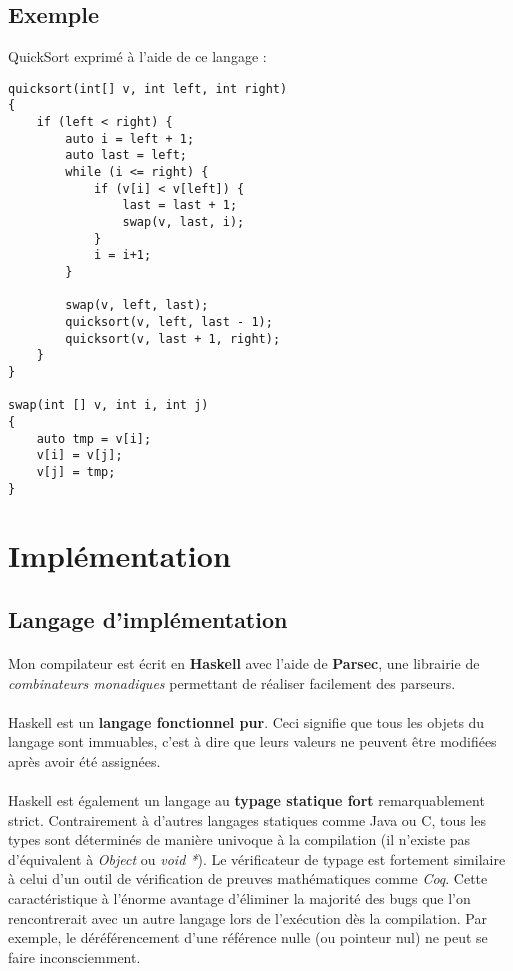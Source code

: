 \documentclass[a4paper]{article}
\begin{document}
  \subsection{Exemple}QuickSort exprimé à l'aide de ce langage :

    \begin{verbatim}
quicksort(int[] v, int left, int right)
{
    if (left < right) {
        auto i = left + 1;
        auto last = left;
        while (i <= right) {
            if (v[i] < v[left]) {
                last = last + 1;
                swap(v, last, i);
            }
            i = i+1;
        }

        swap(v, left, last);
        quicksort(v, left, last - 1);
        quicksort(v, last + 1, right);
    }
}

swap(int [] v, int i, int j)
{
    auto tmp = v[i];
    v[i] = v[j];
    v[j] = tmp;
}
    \end{verbatim}

\newpage

 \section{Implémentation}

  \subsection{Langage d'implémentation}

    \paragraph{}Mon compilateur est écrit en \textbf{Haskell} avec l'aide de
\textbf{Parsec}, une librairie de \textit{combinateurs monadiques} permettant de
réaliser facilement des parseurs.

    \paragraph{}Haskell est un \textbf{langage fonctionnel pur}. Ceci signifie
que tous les objets du langage sont immuables, c'est à dire que leurs valeurs ne
peuvent être modifiées après avoir été assignées.

    \paragraph{}Haskell est également un langage au \textbf{typage statique fort}
remarquablement strict. Contrairement à d'autres langages statiques comme Java
ou C, tous les types sont déterminés de manière univoque à la compilation (il
n'existe pas d'équivalent à \textit{Object} ou \textit{void *}). Le vérificateur
de typage est fortement similaire à celui d'un outil de vérification de preuves
mathématiques comme \textit{Coq}. \newline
Cette caractéristique à l'énorme avantage d'éliminer la majorité des bugs que
l'on rencontrerait avec un autre langage lors de l'exécution dès la compilation.
Par exemple, le déréférencement d'une référence nulle (ou pointeur nul) ne peut
se faire inconsciemment.
\end{document}
